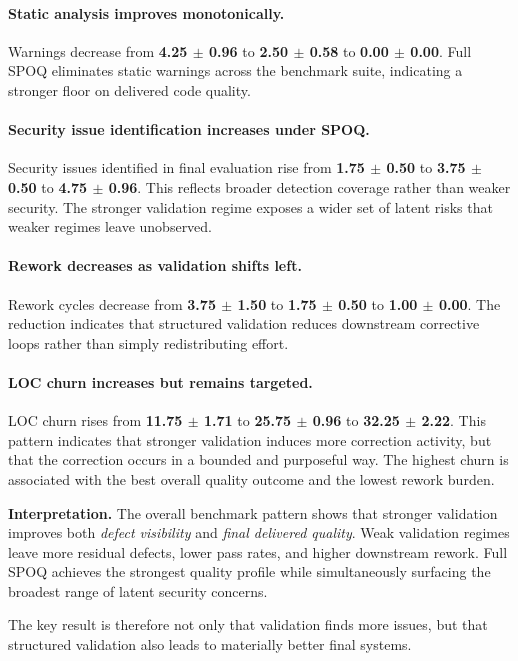 \paragraph{Static analysis improves monotonically.}
Warnings decrease from \textbf{4.25 $\pm$ 0.96} to \textbf{2.50 $\pm$ 0.58} to \textbf{0.00 $\pm$ 0.00}. Full SPOQ eliminates static warnings across the benchmark suite, indicating a stronger floor on delivered code quality.

\paragraph{Security issue identification increases under SPOQ.}
Security issues identified in final evaluation rise from \textbf{1.75 $\pm$ 0.50} to \textbf{3.75 $\pm$ 0.50} to \textbf{4.75 $\pm$ 0.96}. This reflects broader detection coverage rather than weaker security. The stronger validation regime exposes a wider set of latent risks that weaker regimes leave unobserved.

\paragraph{Rework decreases as validation shifts left.}
Rework cycles decrease from \textbf{3.75 $\pm$ 1.50} to \textbf{1.75 $\pm$ 0.50} to \textbf{1.00 $\pm$ 0.00}. The reduction indicates that structured validation reduces downstream corrective loops rather than simply redistributing effort.

\paragraph{LOC churn increases but remains targeted.}
LOC churn rises from \textbf{11.75 $\pm$ 1.71} to \textbf{25.75 $\pm$ 0.96} to \textbf{32.25 $\pm$ 2.22}. This pattern indicates that stronger validation induces more correction activity, but that the correction occurs in a bounded and purposeful way. The highest churn is associated with the best overall quality outcome and the lowest rework burden.

\textbf{Interpretation.}
The overall benchmark pattern shows that stronger validation improves both \textit{defect visibility} and \textit{final delivered quality}. Weak validation regimes leave more residual defects, lower pass rates, and higher downstream rework. Full SPOQ achieves the strongest quality profile while simultaneously surfacing the broadest range of latent security concerns.

The key result is therefore not only that validation finds more issues, but that structured validation also leads to materially better final systems.

